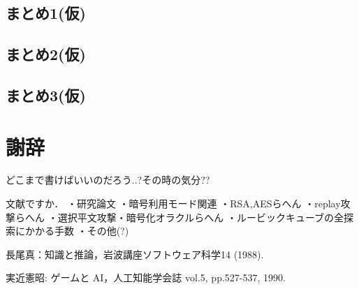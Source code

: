 \documentclass{jsarticle}
\begin{document}
\subsection{まとめ1(仮)}
\subsection{まとめ2(仮)}
\subsection{まとめ3(仮)}
\section{謝辞}
どこまで書けばいいのだろう..?その時の気分??

\newpage 
文献ですか．
・研究論文
・暗号利用モード関連
・RSA,AESらへん
・replay攻撃らへん
・選択平文攻撃・暗号化オラクルらへん
・ルービックキューブの全探索にかかる手数
・その他(?)

\begin{thebibliography}{}

 長尾真：知識と推論，岩波講座ソフトウェア科学14 (1988). 

 実近憲昭: ゲームと AI，人工知能学会誌 vol.5, pp.527-537, 1990.

\end{thebibliography}
\end{document}
